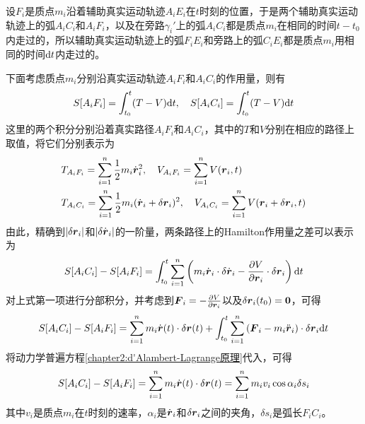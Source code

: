 设$F_i$是质点$m_i$沿着辅助真实运动轨迹$A_iE_i$在$t$时刻的位置，于是两个辅助真实运动轨迹上的弧$A_iC_i$和$A_iF_i$，以及在旁路$\gamma_i'$上的弧$A_iC_i$都是质点$m_i$在相同的时间$t-t_0$内走过的，所以辅助真实运动轨迹上的弧$F_iE_i$和旁路上的弧$C_iE_i$都是质点$m_i$用相同的时间$\mathrm{d} t$内走过的。

下面考虑质点$m_i$分别沿真实运动轨迹$A_iF_i$和$A_iC_i$的作用量，则有
\begin{equation}
	S[A_iF_i] = \int_{t_0}^t (T-V)\mathrm{d} t,\quad S[A_iC_i] = \int_{t_0}^t (T-V)\mathrm{d} t
\end{equation}
这里的两个积分分别沿着真实路径$A_iF_i$和$A_iC_i$，其中的$T$和$V$分别在相应的路径上取值，将它们分别表示为
\begin{align}
	& T_{A_iF_i} = \sum_{i=1}^n \frac12 m_i\dot{\boldsymbol{r}}_i^2, \quad V_{A_iF_i} = \sum_{i=1}^n V(\boldsymbol{r}_i,t) \\
	& T_{A_iC_i} = \sum_{i=1}^n \frac12 m_i(\dot{\boldsymbol{r}}_i+\delta\boldsymbol{r}_i)^2, \quad V_{A_iC_i} = \sum_{i=1}^n V(\boldsymbol{r}_i+\delta\boldsymbol{r}_i,t)
\end{align}
由此，精确到$|\delta\boldsymbol{r}_i|$和$|\delta\dot{\boldsymbol{r}}_i|$的一阶量，两条路径上的Hamilton作用量之差可以表示为
\begin{equation*}
	S[A_iC_i]-S[A_iF_i] = \int_{t_0}^t \sum_{i=1}^n \left(m_i\dot{\boldsymbol{r}}_i\cdot \delta \dot{\boldsymbol{r}}_i - \frac{\partial V}{\partial \boldsymbol{r}_i}\cdot \delta\boldsymbol{r}_i\right) \mathrm{d} t
\end{equation*}
对上式第一项进行分部积分，并考虑到$\boldsymbol{F}_i = -\frac{\partial V}{\partial \boldsymbol{r}_i}$以及$\delta \boldsymbol{r}_i(t_0) = \boldsymbol{0}$，可得
\begin{equation*}
	S[A_iC_i]-S[A_iF_i] = \sum_{i=1}^n m_i\dot{\boldsymbol{r}}(t)\cdot \delta\boldsymbol{r}(t) + \int_{t_0}^t \sum_{i=1}^n \left(\boldsymbol{F}_i-m_i\ddot{\boldsymbol{r}}_i\right)\cdot \delta \boldsymbol{r}_i \mathrm{d} t
\end{equation*}
将动力学普遍方程\eqref{chapter2:d'Alambert-Lagrange原理}代入，可得
\begin{equation}
	S[A_iC_i]-S[A_iF_i] = \sum_{i=1}^n m_i\dot{\boldsymbol{r}}(t)\cdot \delta\boldsymbol{r}(t) = \sum_{i=1}^n m_iv_i\cos\alpha_i\delta s_i
	\label{chapter9:两条终点不同正路作用量之差}
\end{equation}
其中$v_i$是质点$m_i$在$t$时刻的速率，$\alpha_i$是$\dot{\boldsymbol{r}}_i$和$\delta\boldsymbol{r}_i$之间的夹角，$\delta s_i$是弧长$F_iC_i$。

